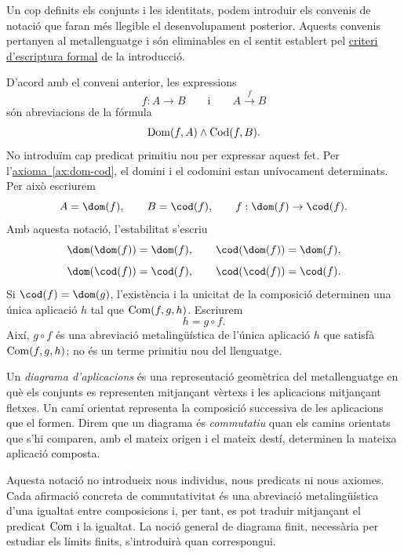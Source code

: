 Un cop definits els conjunts i les identitats, podem introduir els convenis de notació que faran més llegible el desenvolupament posterior. Aquests convenis pertanyen al metallenguatge i són eliminables en el sentit establert pel \hyperref[not:criteri-formal]{criteri d'escriptura formal} de la introducció.

\begin{notacio}\label{not:aplicacions-tipades}
D'acord amb el conveni anterior, les expressions
\[
f:A\rightarrow B
\qquad\text{i}\qquad
A\xrightarrow{f}B
\]
són abreviacions de la fórmula
\[
\operatorname{Dom}(f,A)\land\operatorname{Cod}(f,B).
\]
No introduïm cap predicat primitiu nou per expressar aquest fet.
Per l'\hyperref[ax:dom-cod]{axioma~\ref*{ax:dom-cod}}, el domini i el codomini estan unívocament determinats. Per això escriurem
\[
A=\dom(f),
\qquad
B=\cod(f),
\qquad
f:\dom(f)\to\cod(f).
\]
Amb aquesta notació, l'estabilitat s'escriu
\[
\dom(\dom(f))=\dom(f),
\qquad
\cod(\dom(f))=\dom(f),
\]
\[
\dom(\cod(f))=\cod(f),
\qquad
\cod(\cod(f))=\cod(f).
\]
Si \(\cod(f)=\dom(g)\), l'existència i la unicitat de la composició determinen una única aplicació \(h\) tal que \(\operatorname{Com}(f,g,h)\). Escriurem
\[
h=g\circ f.
\]
Així, \(g\circ f\) és una abreviació metalingüística de l'única aplicació \(h\) que satisfà \(\operatorname{Com}(f,g,h)\); no és un terme primitiu nou del llenguatge.
\end{notacio}

\begin{notacio}
\label{not:diagrames-commutatius}

Un \emph{diagrama d'aplicacions} és una representació geomètrica
del metallenguatge en què els conjunts es representen mitjançant
vèrtexs i les aplicacions mitjançant fletxes. Un camí orientat
representa la composició successiva de les aplicacions que el
formen. Direm que un diagrama és \emph{commutatiu} quan els camins orientats que s'hi comparen,
amb el mateix origen i el mateix destí, determinen la mateixa aplicació composta.

Aquesta notació no introdueix nous individus, nous predicats ni
nous axiomes. Cada afirmació concreta de commutativitat és una
abreviació metalingüística d'una igualtat entre composicions i,
per tant, es pot traduir mitjançant el predicat \(\operatorname{Com}\) i la
igualtat. La noció general de diagrama finit, necessària per
estudiar els límits finits, s'introduirà quan correspongui.
\end{notacio}

